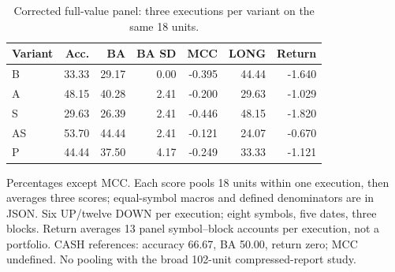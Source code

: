 \begin{table}[htbp]
\centering\small
\caption{Corrected full-value panel: three executions per variant on the same 18 units.}
\label{tab:r4_value_metrics}
\setlength{\tabcolsep}{3.5pt}
\begin{tabular}{lrrrrrr}
\hline
Variant & Acc. & BA & BA SD & MCC & LONG & Return \\
\hline
B & 33.33 & 29.17 & 0.00 & -0.395 & 44.44 & -1.640 \\
A & 48.15 & 40.28 & 2.41 & -0.200 & 29.63 & -1.029 \\
S & 29.63 & 26.39 & 2.41 & -0.446 & 48.15 & -1.820 \\
AS & 53.70 & 44.44 & 2.41 & -0.121 & 24.07 & -0.670 \\
P & 44.44 & 37.50 & 4.17 & -0.249 & 33.33 & -1.121 \\
\hline
\end{tabular}
\par\smallskip\footnotesize Percentages except MCC. Each score pools 18 units within one execution, then averages three scores; equal-symbol macros and defined denominators are in JSON. Six UP/twelve DOWN per execution; eight symbols, five dates, three blocks. Return averages 13 panel symbol--block accounts per execution, not a portfolio. CASH references: accuracy 66.67, BA 50.00, return zero; MCC undefined. No pooling with the broad 102-unit compressed-report study.
\end{table}
